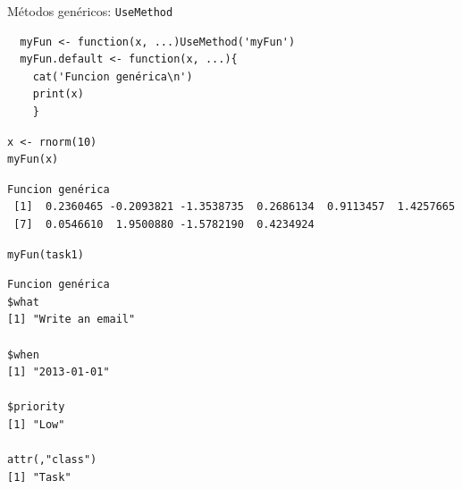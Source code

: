 \documentclass[xcolor={usenames,svgnames,dvipsnames}]{beamer}
\begin{document}
\begin{frame}[label={sec:org1cf3f15},fragile]{Métodos genéricos: \texttt{UseMethod}}
 \lstset{language=r,label= ,caption= ,captionpos=b,numbers=none}
\begin{lstlisting}
  myFun <- function(x, ...)UseMethod('myFun')
  myFun.default <- function(x, ...){
    cat('Funcion genérica\n')
    print(x)
    }
\end{lstlisting}

\lstset{language=r,label= ,caption= ,captionpos=b,numbers=none}
\begin{lstlisting}
x <- rnorm(10)
myFun(x)
\end{lstlisting}

\begin{verbatim}
Funcion genérica
 [1]  0.2360465 -0.2093821 -1.3538735  0.2686134  0.9113457  1.4257665
 [7]  0.0546610  1.9500880 -1.5782190  0.4234924
\end{verbatim}


\lstset{language=r,label= ,caption= ,captionpos=b,numbers=none}
\begin{lstlisting}
myFun(task1)
\end{lstlisting}

\begin{verbatim}
Funcion genérica
$what
[1] "Write an email"

$when
[1] "2013-01-01"

$priority
[1] "Low"

attr(,"class")
[1] "Task"
\end{verbatim}
\end{frame}
\end{document}
